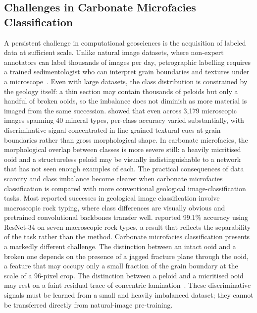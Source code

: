 \documentclass[a4paper,fleqn]{cas-dc}
\begin{document}
\subsection{Challenges in Carbonate Microfacies Classification}
A persistent challenge in computational geosciences is the acquisition of labeled data at sufficient scale. Unlike natural image datasets, where non-expert annotators can label thousands of images per day, petrographic labelling requires a trained sedimentologist who can interpret grain boundaries and textures under a microscope~\citep{koeshidayatullah2020}. Even with large datasets, the class distribution is constrained by the geology itself: a thin section may contain thousands of peloids but only a handful of broken ooids, so the imbalance does not diminish as more material is imaged from the same succession.
\citet{dalhat2025} showed that even across 3,179 microscopic images spanning 40 mineral types, per-class accuracy varied substantially, with discriminative signal concentrated in fine-grained textural cues at grain boundaries rather than gross morphological shape. In carbonate microfacies, the morphological overlap between classes is more severe still: a heavily micritised ooid and a structureless peloid may be visually indistinguishable to a network that has not seen enough examples of each.
The practical consequences of data scarcity and class imbalance become clearer when carbonate microfacies classification is compared with more conventional geological image-classification tasks. Most reported successes in geological image classification involve macroscopic rock typing, where class differences are visually obvious and pretrained convolutional backbones transfer well. \citet{chen2023} reported 99.1\% accuracy using ResNet-34 on seven macroscopic rock types, a result that reflects the separability of the task rather than the method.
Carbonate microfacies classification presents a markedly different challenge. The distinction between an intact ooid and a broken one depends on the presence of a jagged fracture plane through the ooid, a feature that may occupy only a small fraction of the grain boundary at the scale of a 96-pixel crop. The distinction between a peloid and a micritised ooid may rest on a faint residual trace of concentric lamination~\citep{flugel2010}. These discriminative signals must be learned from a small and heavily imbalanced dataset; they cannot be transferred directly from natural-image pre-training.
\end{document}
